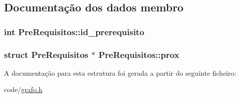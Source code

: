 \subsection{Documentação dos dados membro}
\hypertarget{structPreRequisitos_aac895640418edfa91ba7c8f01b91459e}{
\subsubsection[{id\-\_\-prerequisito}]{\setlength{\rightskip}{0pt plus 5cm}int Pre\-Requisitos\-::id\-\_\-prerequisito}}\label{structPreRequisitos_aac895640418edfa91ba7c8f01b91459e}
\hypertarget{structPreRequisitos_ac5ae4b6f87e80302c8f902b5d5ac411a}{
\subsubsection[{prox}]{\setlength{\rightskip}{0pt plus 5cm}struct {\bf Pre\-Requisitos} $\ast$ Pre\-Requisitos\-::prox}}\label{structPreRequisitos_ac5ae4b6f87e80302c8f902b5d5ac411a}


A documentação para esta estrutura foi gerada a partir do seguinte ficheiro\-:\begin{DoxyCompactItemize}
\item 
code/\hyperlink{code_2grafo_8h}{grafo.\-h}\end{DoxyCompactItemize}
